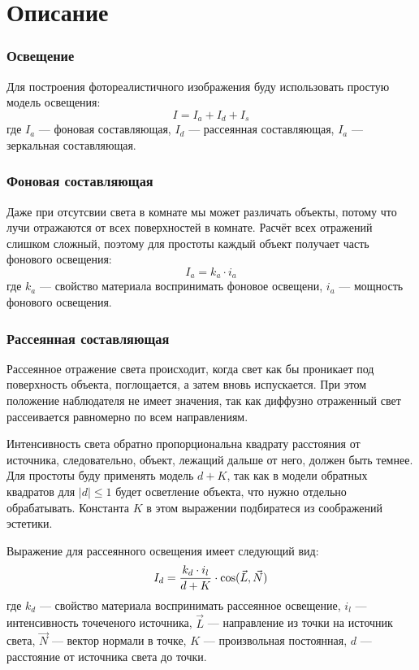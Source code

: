 \section{Описание}

\subsubsection*{Освещение}
Для построения фотореалистичного изображения буду использовать простую модель освещения:
\begin{equation*}
    I = I_a + I_d + I_s
\end{equation*}
где $I_a$ --- фоновая составляющая, $I_d$ --- рассеянная составляющая, $I_a$ --- зеркальная составляющая.

\subsubsection*{Фоновая составляющая}
Даже при отсутсвии света в комнате мы может различать объекты, потому что лучи отражаются от всех поверхностей в комнате. Расчёт всех отражений слишком сложный, поэтому для простоты каждый объект получает часть фонового освещения:
\begin{equation*}
    I_a = k_a \cdot i_a
\end{equation*}
где $k_a$ --- свойство материала воспринимать фоновое освещени, $i_a$ --- мощность фонового освещения.

\subsubsection*{Рассеянная составляющая}
Рассеянное отражение света происходит, когда свет как бы проникает под поверхность объекта, поглощается, а затем вновь испускается.
При этом положение наблюдателя не имеет значения, так как диффузно отраженный свет рассеивается равномерно по всем направлениям.

Интенсивность света обратно пропорциональна квадрату расстояния от источника, следовательно, объект, лежащий дальше от него, должен быть темнее. Для простоты буду применять модель $d + K$, так как в модели обратных квадратов для $|d| \leqslant 1$ будет осветление объекта, что нужно отдельно обрабатывать. Константа $K$ в этом выражении подбиратеся из соображений эстетики.

Выражение для рассеянного освещения имеет следующий вид:
\begin{equation*}
    I_d = {{k_d \cdot i_l} \over {d + K}} \cdot \cos(\vec{L}, \vec{N})
\end{equation*}
где $k_d$ --- свойство материала воспринимать рассеянное освещение, $i_l$ --- интенсивность точеченого источника, $\vec{L}$ --- направление из точки на источник света, $\vec{N}$ --- вектор нормали в точке, $K$ --- произвольная постоянная, $d$ --- расстояние от источника света до точки.

